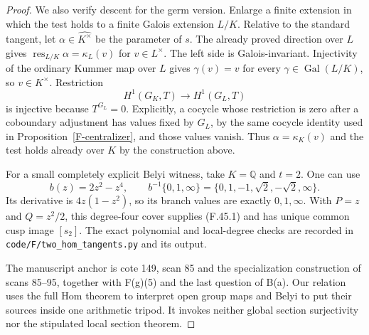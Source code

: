 \documentclass[11pt,oneside]{article}
\begin{document}
\begin{proof}
We also verify descent for the germ version. Enlarge a finite
extension in which the test holds to a finite Galois extension
$L/K$. Relative to the standard tangent, let
$\alpha\in\widehat{K^\times}$ be the parameter of $s$.
The already proved direction over $L$ gives
$\operatorname{res}_{L/K}\alpha=\kappa_L(v)$ for $v\in L^\times$.
The left side is Galois-invariant. Injectivity of the ordinary
Kummer map over $L$ gives $\gamma(v)=v$ for every
$\gamma\in\operatorname{Gal}(L/K)$, so $v\in K^\times$.
Restriction
\[
 H^1(G_K,T)\longrightarrow H^1(G_L,T)
\]
is injective because $T^{G_L}=0$. Explicitly, a cocycle whose
restriction is zero after a coboundary adjustment has values
fixed by $G_L$, by the same cocycle identity used in
Proposition~\ref{F-centralizer}, and those values vanish.
Thus $\alpha=\kappa_K(v)$ and the test holds already over $K$
by the construction above.

For a small completely explicit Belyi witness, take $K=\mathbb Q$
and $t=2$. One can use
\[
 b(z)=2z^2-z^4,
 \qquad
 b^{-1}\{0,1,\infty\}
       =\{0,1,-1,\sqrt2,-\sqrt2,\infty\}.
\]
Its derivative is $4z(1-z^2)$, so its branch values are exactly
$0,1,\infty$. With $P=z$ and $Q=z^2/2$, this degree-four
cover supplies (F.45.1) and has unique common cusp image $[s_2]$.
The exact polynomial and local-degree checks are recorded in
\texttt{code/F/two\_hom\_tangents.py} and its output.

The manuscript anchor is cote 149, scan 85 and the specialization
construction of scans 85--95, together with F(g)(5) and the last
question of B(a). Our relation uses the full Hom theorem to
interpret open group maps and Belyi to put their sources inside
one arithmetic tripod. It invokes neither global section
surjectivity nor the stipulated local section theorem.
\end{proof}
\end{document}
